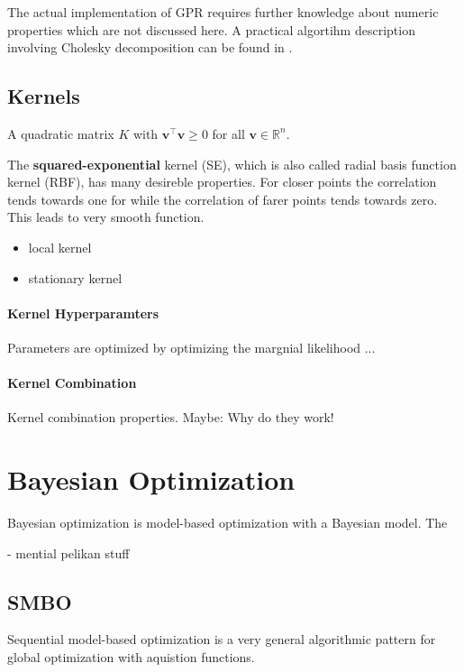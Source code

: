 \documentclass[english]{article}
\begin{document}
The actual implementation of \ac{GPR} requires further knowledge about numeric properties which are not discussed here. A practical algortihm description involving Cholesky decomposition can be found in \cite[Algorithm 2.1]{rasmussen_gaussian_2006}.




\subsection{Kernels}
A quadratic matrix $K$ with $\mathbf{v}^\top \mathbf{v} \ge 0$ for all $\mathbf{v} \in \mathbb{R}^n$.

The \textbf{squared-exponential} kernel (SE), which is also called radial basis function kernel (RBF), has many desireble properties. For closer points the correlation tends towards one for while the correlation of farer points tends towards zero. This leads to very smooth function.

\begin{itemize}
  \item local kernel
  \item stationary kernel
\end{itemize}

\paragraph{Kernel Hyperparamters}
Parameters are optimized by optimizing the margnial likelihood ...

\paragraph{Kernel Combination}
Kernel combination properties. Maybe: Why do they work!



\section{Bayesian Optimization}
Bayesian optimization is model-based optimization with a Bayesian model. The

- mential pelikan stuff

\subsection{SMBO}
Sequential model-based optimization is a very general algorithmic pattern for global optimization with aquistion functions.
\end{document}
